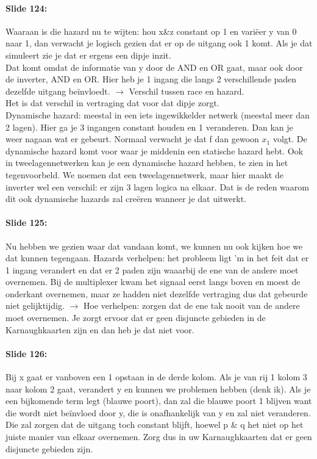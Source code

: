 \documentclass[10pt,a4paper]{book}
\begin{document}
\paragraph{Slide 124:} Waaraan is die hazard nu te wijten: hou x\&z constant op 1 en vari\"eer y van 0 naar 1, dan verwacht je logisch gezien dat er op de uitgang ook 1 komt. Als je dat simuleert zie je dat er ergens een dipje inzit.\\
Dat komt omdat de informatie van y door de AND en OR gaat, maar ook door de inverter, AND en OR. Hier heb je 1 ingang die langs 2 verschillende paden dezelfde uitgang be\"invloedt. $\rightarrow$ Verschil tussen race en hazard.\\
Het is dat verschil in vertraging dat voor dat dipje zorgt.\\
Dynamische hazard: meestal in een iets ingewikkelder netwerk (meestal meer dan 2 lagen). Hier ga je 3 ingangen constant houden en 1 veranderen. Dan kan je weer nagaan wat er gebeurt. Normaal verwacht je dat f dan gewoon $x_1$ volgt. De dynamische hazard komt voor waar je middenin een statische hazard hebt. Ook in tweelagennetwerken kan je een dynamische hazard hebben, te zien in het tegenvoorbeld. We noemen dat een tweelagennetwerk, maar hier maakt de inverter wel een verschil: er zijn 3 lagen logica na elkaar. Dat is de reden waarom dit ook dynamische hazards zal cre\"eren wanneer je dat uitwerkt.

\paragraph{Slide 125:} Nu hebben we gezien waar dat vandaan komt, we kunnen nu ook kijken hoe we dat kunnen tegengaan. Hazards verhelpen: het probleem ligt 'm in het feit dat er 1 ingang verandert en dat er 2 paden zijn waaarbij de ene van de andere moet overnemen. Bij de multiplexer kwam het signaal eerst langs boven en moest de onderkant overnemen, maar ze hadden niet dezelfde vertraging dus dat gebeurde niet gelijktijdig. $\rightarrow$ Hoe verhelpen: zorgen dat de ene tak nooit van de andere moet overnemen. Je zorgt ervoor dat er geen disjuncte gebieden in de Karnaughkaarten zijn en dan heb je dat niet voor.

\paragraph{Slide 126:} Bij x gaat er vanboven een 1 opstaan in de derde kolom. Als je van rij 1 kolom 3 naar kolom 2 gaat, verandert y en kunnen we problemen hebben (denk ik). Als je een bijkomende term legt (blauwe poort), dan zal die blauwe poort 1 blijven want die wordt niet be\"invloed door y, die is onafhankelijk van y en zal niet veranderen. Die zal zorgen dat de uitgang toch constant blijft, hoewel p \& q het niet op het juiste manier van elkaar overnemen. Zorg dus in uw Karnaughkaarten dat er geen disjuncte gebieden zijn.
\end{document}
